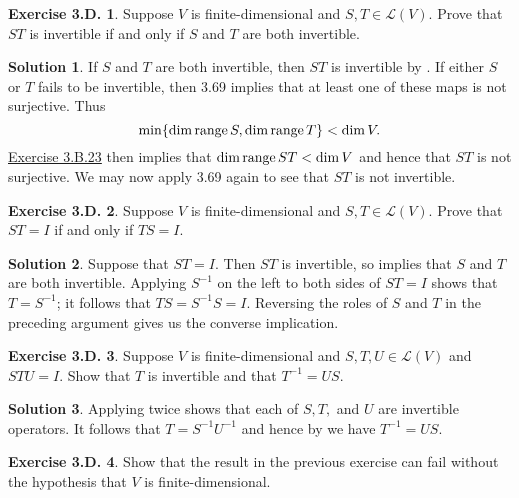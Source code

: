 \documentclass[12pt]{article}
\theoremstyle{definition}
\theoremstyle{exercise}
\newtheorem{exercise}{Exercise 3.D.}
\theoremstyle{solution}
\newtheorem*{solution}{Solution}
\newcommand{\lmap}{\mathcal{L}}
\newcommand{\Range}{\text{range\,}}
\begin{document}
\begin{exercise}
\label{ex:9}
    Suppose \( V \) is finite-dimensional and \( S, T \in \lmap(V) \). Prove that \( ST \) is invertible if and only if \( S \) and \( T \) are both invertible.
\end{exercise}

\begin{solution}
    If \( S \) and \( T \) are both invertible, then \( ST \) is invertible by . If either \( S \) or \( T \) fails to be invertible, then 3.69 implies that at least one of these maps is not surjective. Thus
    \[
        \min \{ \dim \Range S, \dim \Range T \} < \dim V.
    \]
    \href{https://lew98.github.io/Mathematics/LADR_Section_3_B_Exercises.pdf}{Exercise 3.B.23} then implies that \( \dim \Range ST < \dim V \) and hence that \( ST \) is not surjective. We may now apply 3.69 again to see that \( ST \) is not invertible.
\end{solution}

\begin{exercise}
\label{ex:10}
    Suppose \( V \) is finite-dimensional and \( S, T \in \lmap(V) \). Prove that \( ST = I \) if and only if \( TS = I \).
\end{exercise}

\begin{solution}
    Suppose that \( ST = I \). Then \( ST \) is invertible, so  implies that \( S \) and \( T \) are both invertible. Applying \( S^{-1} \) on the left to both sides of \( ST = I \) shows that \( T = S^{-1} \); it follows that \( TS = S^{-1}S = I \). Reversing the roles of \( S \) and \( T \) in the preceding argument gives us the converse implication.
\end{solution}

\begin{exercise}
\label{ex:11}
    Suppose \( V \) is finite-dimensional and \( S, T, U \in \lmap(V) \) and \( STU = I \). Show that \( T \) is invertible and that \( T^{-1} = US \).
\end{exercise}

\begin{solution}
    Applying  twice shows that each of \( S, T, \) and \( U \) are invertible operators. It follows that \( T = S^{-1} U^{-1} \) and hence by  we have \( T^{-1} = US \).
\end{solution}

\begin{exercise}
\label{ex:12}
    Show that the result in the previous exercise can fail without the hypothesis that \( V \) is finite-dimensional.
\end{exercise}
\end{document}
